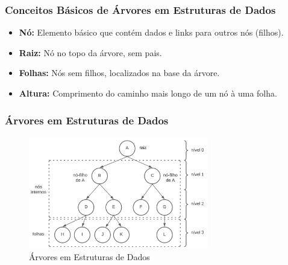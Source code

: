 \begin{frame}[fragile]
  \frametitle{Conceitos Básicos de Árvores em Estruturas de Dados}
  \begin{itemize}
    \item \textbf{Nó:} Elemento básico que contém dados e links para outros nós (filhos).
    \item \textbf{Raiz:} Nó no topo da árvore, sem pais.
    \item \textbf{Folhas:} Nós sem filhos, localizados na base da árvore.
    \item \textbf{Altura:} Comprimento do caminho mais longo de um nó à uma folha.
  \end{itemize}
\end{frame}
\begin{frame}[fragile]
  \frametitle{Árvores em Estruturas de Dados}
  \begin{figure}
    \centering
    \includegraphics[width=0.7\textwidth]{assets/aula5-arvores1.png}
    \caption{Árvores em Estruturas de Dados}
  \end{figure}
\end{frame}

